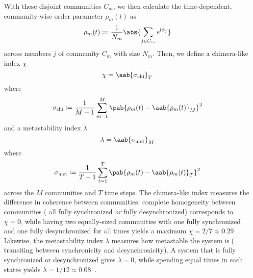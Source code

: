 \documentclass[pdflatex,twocolumn,sn-nature,super]{sn-jnl}
\begin{document}
With these disjoint communities $C_m$, we then calculate
the time-dependent, community-wise order parameter $\rho_m(t)$
as
\begin{equation}
  \rho_m(t) \coloneqq \frac{1}{N_m} \abs{\sum_{j \in C_m} e^{\im \phi_j}}
\end{equation}
across members $j$ of community $C_m$ with size $N_m$.
Then, we define a chimera-like index $\chi$
\begin{equation}
  \chi = \aab{
    \sigma_{\text{chi}}}_T
  \label{eq:chimera_index}
\end{equation}
where
\begin{equation*}
    \sigma_{\text{chi}} \coloneqq \frac{1}{M-1} \sum_{m=1}^M
    \pab{\rho_m(t) - \aab{\rho_m(t)}_M}^2
\end{equation*}
and a metastability index $\lambda$
\begin{equation}
  \lambda = \aab{
    \sigma_{\text{met}}}_M
  \label{eq:metastability_index}
\end{equation}
where
\begin{equation*}
    \sigma_{\text{met}} \coloneqq \frac{1}{T-1} \sum_{t=1}^T
    \pab{\rho_m(t) - \aab{\rho_m(t)}_T}^2
\end{equation*}
across the $M$ communities and $T$ time steps.
The chimera-like index measures the difference in coherence between communities:
complete homogeneity between communities
(\eg{} all fully synchronized \emph{or} fully desynchronized)
corresponds to $\chi = 0$,
while having two equally-sized communities
with one fully synchronized and one fully desynchronized
for all times yields a maximum $\chi = 2/7 \approx
\num{0.29}$~\citep{shanahan2010metastable}.
Likewise, the metastability index $\lambda$ measures how metastable
the system is (\ie{} transiting between synchronicity and desynchronicity).
A system that is fully synchronized or desynchronized gives $\lambda = 0$,
while spending equal times in each states yields $\lambda = 1/12
\approx \num{0.08}$~\citep{shanahan2010metastable}.


\backmatter{}



\appendix
\onecolumn

\end{document}
